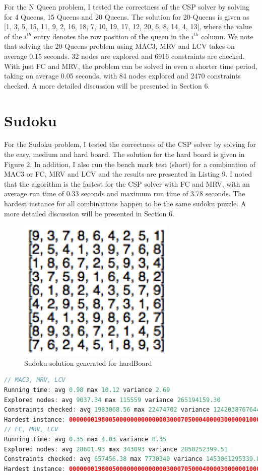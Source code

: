 \documentclass[9.5pt]{extarticle}
\begin{document}
For the N Queen problem, I tested the correctness of the CSP solver by solving for 4 Queens, 15 Queens and 20 Queens. The solution for 20-Queens is given as [1, 3, 5, 15, 11, 9, 2, 16, 18, 7, 10, 19, 17, 12, 20, 6, 8, 14, 4, 13], where the value of the $i^{th}$ entry denotes the row position of the queen in the $i^{th}$ column. We note that solving the 20-Queens problem using MAC3, MRV and LCV takes on average 0.15 seconds. 32 nodes are explored and 6916 constraints are checked. With just FC and MRV, the problem can be solved in even a shorter time period, taking on average 0.05 seconds, with 84 nodes explored and 2470 constraints checked. A more detailed discussion will be presented in Section 6.


\section{Sudoku}

For the Sudoku problem, I tested the correctness of the CSP solver by solving for the easy, medium and hard board. The solution for the hard board is given in Figure 2. In addition, I also run the bench mark test (short) for a combination of MAC3 or FC, MRV and LCV and the results are presented in Listing 9. I noted that the algorithm is the fastest for the CSP solver with FC and MRV, with an average run time of 0.33 seconds and maximum run time of 3.78 seconds. The hardest instance for all combinations happen to be the same sudoku puzzle. A more detailed discussion will be presented in Section 6.

\begin{figure}[H]
\centering
\includegraphics[scale=0.7]{sudoku.png}
\caption{Sudoku solution generated for hardBoard}
\label{Figure 1}
\end{figure}

\begin{lstlisting}[language=java,caption={results from benchmark test (short)}]
// MAC3, MRV, LCV
Running time: avg 0.98 max 10.12 variance 2.69
Explored nodes: avg 9037.34 max 115559 variance 265194159.30
Constraints checked: avg 1983068.56 max 22474702 variance 12420387676441.33
Hardest instance: 000000019800500000000000000300070500040000300000010000470000060000200400010900000
// FC, MRV, LCV
Running time: avg 0.35 max 4.03 variance 0.35
Explored nodes: avg 28601.93 max 343093 variance 2850252399.51
Constraints checked: avg 657456.38 max 7730340 variance 1453061295339.88
Hardest instance: 000000019800500000000000000300070500040000300000010000470000060000200400010900000
\end{lstlisting} 
\end{document}
